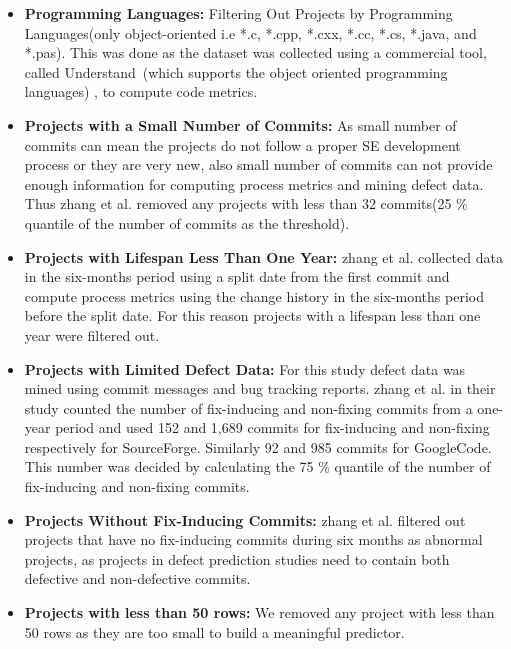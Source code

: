 \documentclass[sigconf]{acmart}
\newcommand{\bi}{\begin{itemize}[leftmargin=0.4cm]}
\newcommand{\ei}{\end{itemize}}
\theoremstyle{break}
\begin{document}
\bi

    \item \textbf{Programming Languages:} Filtering Out Projects by Programming Languages(only object-oriented i.e *.c, *.cpp, *.cxx, *.cc, *.cs, *.java, and *.pas). This was done as the dataset was collected using a commercial tool, called Understand~\cite{visualize}(which supports the object oriented programming languages) , to compute code metrics. 

    \item \textbf{Projects with a Small Number of Commits:} As small number of commits can mean the projects do not follow a proper SE development process or they are very new, also small number of commits can not provide enough information for computing process metrics and mining defect data. Thus zhang et al. removed any projects with less than 32 commits(25 \% quantile of the number of commits as the threshold).
    
    \item \textbf{Projects with Lifespan Less Than One Year:} zhang et al. collected data in the six-months period using a split date from the first commit and compute process metrics using the change history in the six-months period before the split date. For this reason projects with a lifespan less than one year were filtered out.
    
    \item \textbf{Projects with Limited Defect Data:} For this study defect data was mined using commit messages and bug tracking reports. zhang et al. in their study counted the number of fix-inducing and non-fixing commits from a one-year period and used 152 and 1,689 commits for fix-inducing and non-fixing  respectively for SourceForge. Similarly  92 and 985 commits for GoogleCode. This number was decided by calculating the 75 \% quantile of the number of fix-inducing and non-fixing commits.
    
    \item \textbf{Projects Without Fix-Inducing Commits:} zhang et al. filtered out projects that have no fix-inducing commits during six months as abnormal projects, as projects in defect prediction studies need to contain both defective and non-defective commits.
    
    \item \textbf{Projects with less than 50 rows:} We removed any project with less than 50 rows as they are too small to build a meaningful predictor. 

\ei
\end{document}
